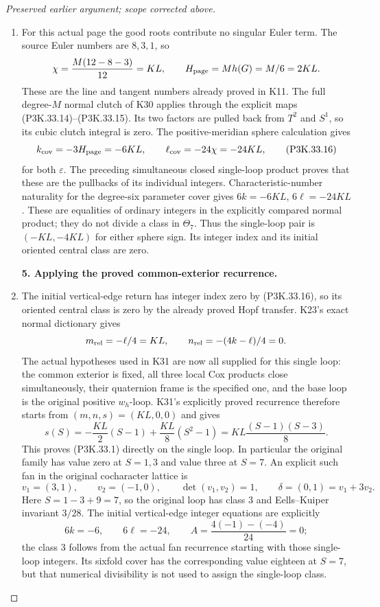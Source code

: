 \begin{proof}[Preserved earlier argument; scope corrected above]
\begin{enumerate}[label=\arabic*.]
\item For this actual page the good roots contribute no singular Euler
term. The source Euler numbers are \(8,3,1\), so
\[
       \chi=\frac{M(12-8-3)}{12}=KL,
       \qquad H_{\rm page}=M h(G)=M/6=2KL.
\]
These are the line and tangent numbers already proved in K11.
The full degree-\(M\) normal clutch of K30 applies through
the explicit maps (P3K.33.14)--(P3K.33.15). Its two factors are pulled
back from \(T^2\) and \(S^1\), so its cubic clutch integral
is zero. The positive-meridian sphere calculation gives
\[
              k_{\rm cov}=-3H_{\rm page}=-6KL,
              \qquad \ell_{\rm cov}=-24\chi=-24KL,
                                                               \tag{P3K.33.16}
\]
for both \(\varepsilon\). The preceding simultaneous closed
single-loop product proves that these are the pullbacks of its
individual integers. Characteristic-number naturality for the
degree-six parameter cover gives
\(6k=-6KL\), \(6\ell=-24KL\). These are equalities of
ordinary integers in the explicitly compared normal product;
they do not divide a class in \(\Theta_7\). Thus the single-loop
pair is \((-KL,-4KL)\) for either sphere sign. Its integer
index and its initial oriented central class are zero.

\par\medskip\noindent\textbf{5. Applying the proved common-exterior recurrence.}\enspace

\item The initial vertical-edge return has integer index zero by (P3K.33.16),
so its oriented central class is zero by the already proved Hopf
transfer. K23's exact normal dictionary gives
\[
 m_{\rm rel}=-\ell/4=KL,\qquad
 n_{\rm rel}=-(4k-\ell)/4=0.
\]
The actual hypotheses used in K31 are now all supplied for this
single loop: the common exterior is fixed, all three local Cox
products close simultaneously, their quaternion frame is the
specified one, and the base loop is the original positive
\(w_h\)-loop. K31's explicitly proved recurrence therefore
starts from \((m,n,s)=(KL,0,0)\) and gives
\[
 s(S)=-\frac{KL}{2}(S-1)+\frac{KL}{8}(S^2-1)
      =KL\frac{(S-1)(S-3)}8.
\]
This proves (P3K.33.1) directly on the single loop. In particular the
original family has value zero at \(S=1,3\) and value three
at \(S=7\). An explicit such fan in the original cocharacter
lattice is
\[
 v_1=(3,1),\qquad v_2=(-1,0),\qquad
 \det(v_1,v_2)=1,\qquad
 \delta=(0,1)=v_1+3v_2.
\]
Here \(S=1-3+9=7\), so the original loop has class \(3\)
and Eells--Kuiper invariant \(3/28\). The initial vertical-edge
integer equations are explicitly
\[
 6k=-6,\qquad6\ell=-24,\qquad
 A=\frac{4(-1)-(-4)}{24}=0;
\]
the class \(3\) follows from the actual fan recurrence starting
with those single-loop integers. Its sixfold cover has the corresponding value
eighteen at \(S=7\), but that numerical divisibility is not used
to assign the single-loop class.


\end{enumerate}
\end{proof}
